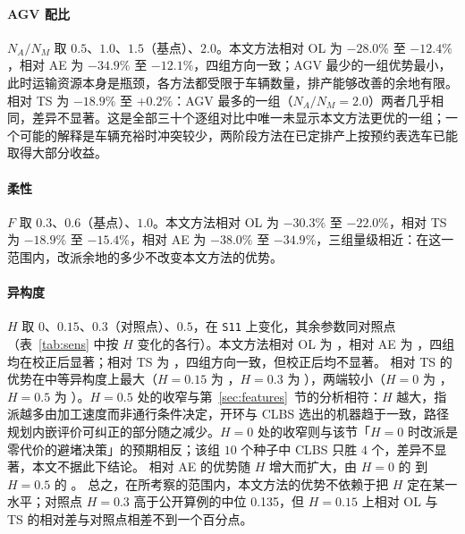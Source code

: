 \documentclass[manuscript,screen,review]{acmart}
\newcommand{\ScnOLRangeB}{$-28.0\%$ 至 $-12.4\%$}
\newcommand{\ScnOLRangeC}{$-30.3\%$ 至 $-22.0\%$}
\newcommand{\ScnTSRangeB}{$-18.9\%$ 至 $+0.2\%$}
\newcommand{\ScnTSRangeC}{$-18.9\%$ 至 $-15.4\%$}
\newcommand{\ScnAERangeB}{$-34.9\%$ 至 $-12.1\%$}
\newcommand{\ScnAERangeC}{$-38.0\%$ 至 $-34.9\%$}
\newcommand{\PubHMed}{0.135}             %
\begin{document}
\paragraph{AGV 配比}
$N_A/N_M$ 取 $0.5$、$1.0$、$1.5$（基点）、$2.0$。本文方法相对 OL 为 \ScnOLRangeB{}，相对 AE 为 \ScnAERangeB{}，四组方向一致；AGV 最少的一组优势最小，此时运输资源本身是瓶颈，各方法都受限于车辆数量，排产能够改善的余地有限。
相对 TS 为 \ScnTSRangeB{}：AGV 最多的一组（$N_A/N_M=2.0$）两者几乎相同，差异不显著。这是全部三十个逐组对比中唯一未显示本文方法更优的一组；一个可能的解释是车辆充裕时冲突较少，两阶段方法在已定排产上按预约表选车已能取得大部分收益。

\paragraph{柔性}
$F$ 取 $0.3$、$0.6$（基点）、$1.0$。本文方法相对 OL 为 \ScnOLRangeC{}，相对 TS 为 \ScnTSRangeC{}，相对 AE 为 \ScnAERangeC{}，三组量级相近：在这一范围内，改派余地的多少不改变本文方法的优势。

\begin{table}[t]
\caption{机器节点容量 $c$ 与异构度 $H$ 的敏感性：逐组各方法的完工时间及本文方法相对三种基线方法的逐对相对差（每组 $n=10$ 个按种子配对的比较）。
表之上半在 \texttt{S11}、\texttt{S21} 上取 $c\in\{1,2,\infty\}$（$H=0.3$），表之下半在 \texttt{S11} 上取 $H\in\{0,0.15,0.3,0.5\}$（$c=2$）；其余参数同对照点。
$c$ 的中间取值（$3,\ldots,10$）见图~\ref{fig:sens_cap}，不列入本表，以免扩大 Holm 族。
显著性标记规则同表~\ref{tab:bytag}，Holm 校正的族为一个对比在一个因素下的全部组（$c$ 为 \SensNCap{} 组，$H$ 为 \SensNHet{} 组）。
\texttt{S11}、$c=2$、$H=0.3$ 即对照点，两半共用一次运行。本批与表~\ref{tab:bytag} 种子相同，但单独运行，且同时运行的进程更多，各配置在同一运行时间内完成的代数较少；故对照点上用满运行时间的 AE、CLBS 与表~\ref{tab:bytag} 不同，由早停终止的 OL、TS 与之相同。比较应在本表之内进行。}
\label{tab:sens}
\small

\end{table}

\paragraph{异构度}
$H$ 取 $0$、$0.15$、$0.3$（对照点）、$0.5$，在 \texttt{S11} 上变化，其余参数同对照点（表~\ref{tab:sens} 中按 $H$ 变化的各行）。本文方法相对 OL 为 \SensOLRangeHet{}，相对 AE 为 \SensAERangeHet{}，四组均在校正后显著；相对 TS 为 \SensTSRangeHet{}，四组方向一致，但校正后均不显著。
相对 TS 的优势在中等异构度上最大（$H=0.15$ 为 \SensTSHLow{}，$H=0.3$ 为 \SensTSHMid{}），两端较小（$H=0$ 为 \SensTSHZero{}，$H=0.5$ 为 \SensTSHHigh{}）。$H=0.5$ 处的收窄与第~\ref{sec:features}~节的分析相符：$H$ 越大，指派越多由加工速度而非通行条件决定，开环与 CLBS 选出的机器趋于一致，路径规划内嵌评价可纠正的部分随之减少。$H=0$ 处的收窄则与该节「$H=0$ 时改派是零代价的避堵决策」的预期相反；该组 $10$ 个种子中 CLBS 只胜 $4$ 个，差异不显著，本文不据此下结论。
相对 AE 的优势随 $H$ 增大而扩大，由 $H=0$ 的 \SensAEHZero{} 到 $H=0.5$ 的 \SensAEHHigh{}。
总之，在所考察的范围内，本文方法的优势不依赖于把 $H$ 定在某一水平；对照点 $H=0.3$ 高于公开算例的中位 \PubHMed{}，但 $H=0.15$ 上相对 OL 与 TS 的相对差与对照点相差不到一个百分点。
\end{document}
